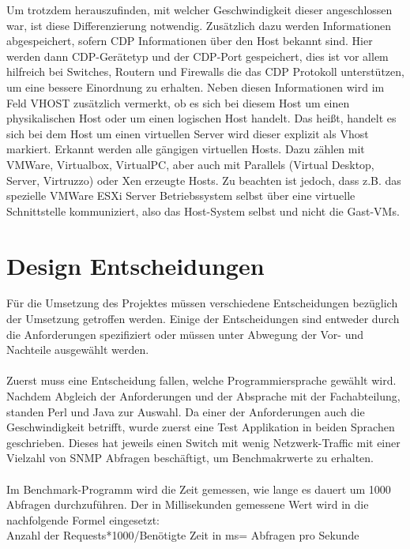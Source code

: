 Um trotzdem herauszufinden, mit welcher Geschwindigkeit dieser angeschlossen war, ist diese Differenzierung notwendig. Zusätzlich dazu werden Informationen abgespeichert, sofern CDP Informationen über den Host bekannt sind. Hier werden dann CDP-Gerätetyp und der CDP-Port gespeichert, dies ist vor allem hilfreich bei Switches, Routern und Firewalls die das CDP Protokoll unterstützen, um eine bessere Einordnung zu erhalten.
Neben diesen Informationen wird im Feld VHOST zusätzlich vermerkt, ob es sich bei diesem Host um einen physikalischen Host oder um einen logischen Host handelt. Das heißt, handelt es sich bei dem Host um einen virtuellen Server wird dieser explizit als Vhost markiert. Erkannt werden alle gängigen virtuellen Hosts. Dazu zählen mit VMWare, Virtualbox, VirtualPC, aber auch mit Parallels (Virtual Desktop, Server, Virtruzzo) oder Xen erzeugte Hosts. Zu beachten ist jedoch, dass z.B. das spezielle VMWare ESXi Server Betriebssystem selbst über eine virtuelle Schnittstelle kommuniziert, also das Host-System selbst und nicht die Gast-VMs.


\section{Design Entscheidungen}
\label{sec:designent}

Für die Umsetzung des Projektes müssen verschiedene Entscheidungen bezüglich der Umsetzung getroffen werden. Einige der Entscheidungen sind entweder durch die Anforderungen spezifiziert oder müssen unter Abwegung der Vor- und Nachteile ausgewählt werden.\\\\
Zuerst muss eine Entscheidung fallen, welche Programmiersprache gewählt wird. Nachdem Abgleich der Anforderungen und der Absprache mit der Fachabteilung, standen Perl und Java zur Auswahl. Da einer der Anforderungen auch die Geschwindigkeit betrifft, wurde zuerst eine Test Applikation in beiden Sprachen geschrieben.
Dieses hat jeweils einen Switch mit wenig Netzwerk-Traffic mit einer Vielzahl von SNMP Abfragen beschäftigt, um Benchmakrwerte zu erhalten.\\\\
Im Benchmark-Programm wird die Zeit gemessen, wie lange es dauert um 1000 Abfragen durchzuführen.
Der in Millisekunden gemessene Wert wird in die nachfolgende Formel eingesetzt:\\

Anzahl der Requests*1000/Benötigte Zeit in ms= Abfragen pro Sekunde\\


